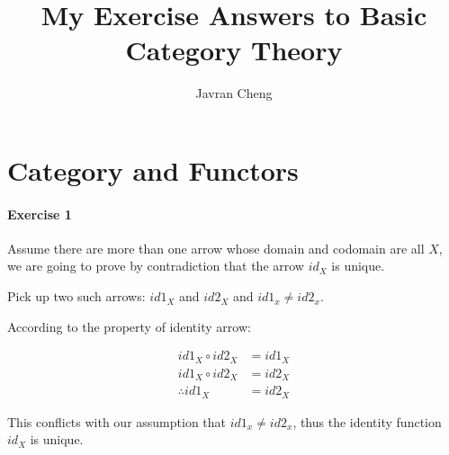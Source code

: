 \documentclass[11pt]{article}
\title{My Exercise Answers to
Basic Category Theory }
\author{Javran Cheng}
\begin{document}
\maketitle

\section{Category and Functors}

\paragraph{Exercise 1}

Assume there are more than one arrow whose domain and codomain are all $X$,
we are going to prove by contradiction that the arrow $id_X$ is unique.

Pick up two such arrows: $id1_X$ and $id2_X$ and $id1_x \neq id2_x$.

According to the property of identity arrow:

\begin{align*}
id1_X \circ id2_X & = id1_X \\
id1_X \circ id2_X & = id2_X \\
\therefore id1_X & = id2_X
\end{align*}

This conflicts with our assumption that $id1_x \neq id2_x$,
thus the identity function $id_X$ is unique.
\end{document}
